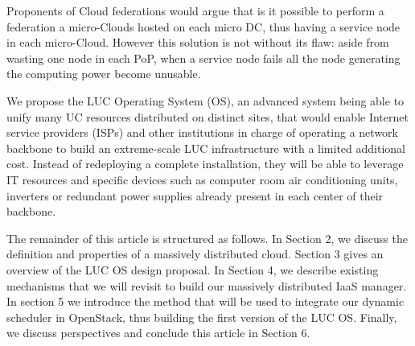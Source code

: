 Proponents of Cloud federations would argue that is it possible to perform
a federation a micro-Clouds hosted on each micro DC, thus having a service node
in each micro-Cloud. However this solution is not without its flaw: aside from
wasting one node in each PoP, when a service node fails all the node generating
the computing power become unusable.

We propose the LUC Operating System (OS), an advanced system being able to unify
many UC resources distributed on distinct sites, that would enable Internet service 
providers (ISPs) and other institutions in charge of operating a network 
backbone to build an extreme-scale LUC infrastructure with a limited additional 
cost. Instead of redeploying a complete installation, they will be able to 
leverage IT resources and specific devices such as computer room air 
conditioning units, inverters or redundant power supplies already present in 
each center of their backbone.

The remainder of this article is structured as follows. In Section 2, we discuss
the definition and properties of a massively distributed cloud. 
Section 3 gives an overview of the LUC OS design 
proposal. In Section 4, we describe existing mechanisms that we will 
revisit to build our massively distributed IaaS manager. In section 5 we 
introduce the method that will be used to integrate our dynamic scheduler in 
OpenStack, thus building the first version of the LUC OS. Finally, we discuss 
perspectives and conclude this article in Section 6.
